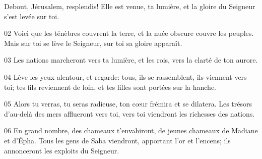 Debout, Jérusalem, resplendis! Elle est venue, ta lumière, et la gloire du Seigneur s’est levée sur toi.

02 Voici que les ténèbres couvrent la terre, et la nuée obscure couvre les peuples. Mais sur toi se lève le Seigneur, sur toi sa gloire apparaît.

03 Les nations marcheront vers ta lumière, et les rois, vers la clarté de ton aurore.

04 Lève les yeux alentour, et regarde: tous, ils se rassemblent, ils viennent vers toi; tes fils reviennent de loin, et tes filles sont portées sur la hanche.

05 Alors tu verras, tu seras radieuse, ton cœur frémira et se dilatera. Les trésors d’au-delà des mers afflueront vers toi, vers toi viendront les richesses des nations.

06 En grand nombre, des chameaux t’envahiront, de jeunes chameaux de Madiane et d’Épha. Tous les gens de Saba viendront, apportant l’or et l’encens; ils annonceront les exploits du Seigneur.